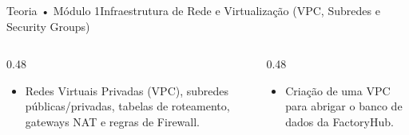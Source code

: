 \begin{senaiframe}{Teoria • Módulo 1}{Infraestrutura de Rede e Virtualização (VPC, Subredes e Security Groups)}
  \begin{columns}[t]
    \begin{column}{0.48\textwidth}
      \begin{tcolorbox}[senaibluecard, title={Fundamentos Teóricos}]
        \begin{itemize}
          \item Redes Virtuais Privadas (VPC), subredes públicas/privadas, tabelas de roteamento, gateways NAT e regras de Firewall.
        \end{itemize}
      \end{tcolorbox}
    \end{column}
    \begin{column}{0.48\textwidth}
      \begin{tcolorbox}[senaigreencard, title={Prática \& Laboratório}]
        \begin{itemize}
          \item Criação de uma VPC para abrigar o banco de dados da FactoryHub.
        \end{itemize}
      \end{tcolorbox}
    \end{column}
  \end{columns}
\end{senaiframe}
